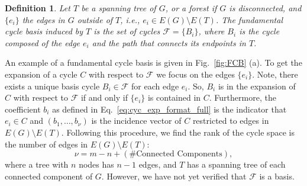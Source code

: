 \documentclass[fleqn,11pt]{article}
\newtheorem{definition}{Definition}
\newcommand\calB{\mathcal{B}}
\newcommand\calF{\mathcal{F}}
\begin{document}

\begin{definition}
	{Let $T$ be a spanning tree of $G$, or a forest if $G$ is disconnected, and $\{e_i\}$ the edges in $G$ outside of $T$, i.e., $e_i\in E(G)\setminus E(T)$. The \emph{fundamental cycle basis} induced by $T$ is the set of cycles $\calF=\{B_i\}$, where $B_i$ is the cycle composed of the edge $e_i$ and the path that connects its endpoints in $T$.}%
	\label{def:FCB}
\end{definition}
\noindent An example of a fundamental cycle basis is given in Fig.~\ref{fig:FCB} (a). To get the expansion of a cycle $C$ with respect to $\calF$ we focus on the edges $\{e_i\}$. Note, there exists a unique basis cycle $B_i\in\calF$ for each edge $e_i$. 
So, $B_i$ is in the expansion of $C$ with respect to $\calF$ if and only if $\{e_i\}$ is contained in $C$. Furthermore, the coefficient $b_i$ as defined in Eq.~\eqref{eq:cyc_exp_format_full} is the indicator that $e_i\in C$ and $(b_1,\hdots,b_\nu)$ is the incidence vector of $C$ restricted to edges in $E(G)\setminus E(T)$.
Following this procedure, we find the rank of the cycle space is the number of edges in $E(G)\setminus E(T)$:
\begin{equation}
	\nu = m-n+(\text{\# Connected Components}),
\end{equation}
where a tree with $n$ nodes has $n-1$ edges, and $T$ has a spanning tree of each connected component of $G$. However, we have not yet verified that $\calF$ is a basis.


\end{document}
